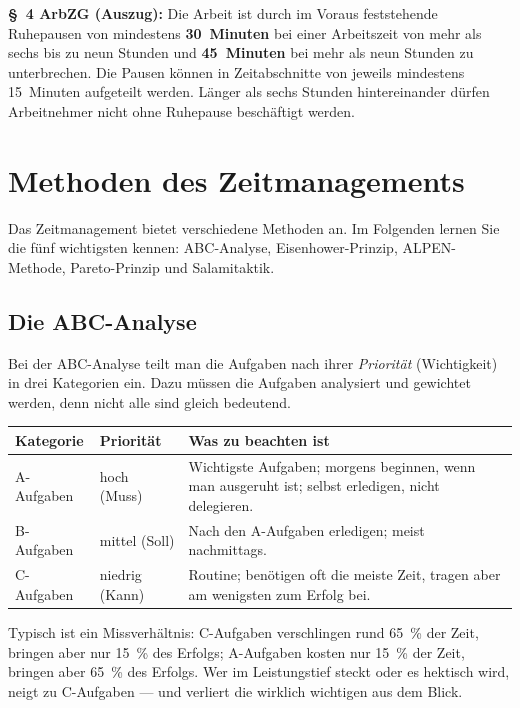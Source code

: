 \documentclass[11pt, a4paper]{article}
\begin{document}
\begin{beispiel}
\textbf{§~4 ArbZG (Auszug):} Die Arbeit ist durch im Voraus feststehende Ruhepausen von
mindestens \textbf{30~Minuten} bei einer Arbeitszeit von mehr als sechs bis zu neun
Stunden und \textbf{45~Minuten} bei mehr als neun Stunden zu unterbrechen. Die Pausen
können in Zeitabschnitte von jeweils mindestens 15~Minuten aufgeteilt werden. Länger als
sechs Stunden hintereinander dürfen Arbeitnehmer nicht ohne Ruhepause beschäftigt werden.
\end{beispiel}

\section{Methoden des Zeitmanagements}

Das Zeitmanagement bietet verschiedene Methoden an. Im Folgenden lernen Sie die fünf
wichtigsten kennen: ABC-Analyse, Eisenhower-Prinzip, ALPEN-Methode, Pareto-Prinzip und
Salamitaktik.

\subsection{Die ABC-Analyse}

Bei der ABC-Analyse teilt man die Aufgaben nach ihrer \emph{Priorität} (Wichtigkeit) in
drei Kategorien ein. Dazu müssen die Aufgaben analysiert und gewichtet werden, denn nicht
alle sind gleich bedeutend.

\begin{center}
\begin{tabular}{p{2.4cm} p{3.2cm} p{6.4cm}}
\toprule
\textbf{Kategorie} & \textbf{Priorität} & \textbf{Was zu beachten ist}\\
\midrule
A-Aufgaben & hoch (Muss) & Wichtigste Aufgaben; morgens beginnen, wenn man ausgeruht ist; selbst erledigen, nicht delegieren.\\
B-Aufgaben & mittel (Soll) & Nach den A-Aufgaben erledigen; meist nachmittags.\\
C-Aufgaben & niedrig (Kann) & Routine; benötigen oft die meiste Zeit, tragen aber am wenigsten zum Erfolg bei.\\
\bottomrule
\end{tabular}
\end{center}

\medskip
Typisch ist ein Missverhältnis: C-Aufgaben verschlingen rund 65~\% der Zeit, bringen aber
nur 15~\% des Erfolgs; A-Aufgaben kosten nur 15~\% der Zeit, bringen aber 65~\% des
Erfolgs. Wer im Leistungstief steckt oder es hektisch wird, neigt zu C-Aufgaben --- und
verliert die wirklich wichtigen aus dem Blick.
\end{document}
